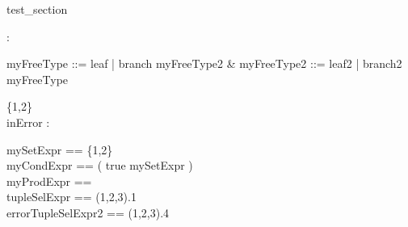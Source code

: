 \begin{zsection}
 \SECTION test\_section
\end{zsection}


\begin{zed}
[ \arithmos ]
\end{zed}

\begin{zed}
  [A,B]
\end{zed}

\begin{axdef}
 \nat : \power \arithmos
\end{axdef}

\begin{zed}
  myFreeType ::= leaf | branch \ldata myFreeType2 \rdata &
  myFreeType2 ::= leaf2 | branch2 \ldata myFreeType \rdata
\end{zed}

\begin{axdef}
  \{1,2\}\\
  inError : \nat
\end{axdef}

\begin{zed}
  mySetExpr == \{1,2\}\\
  myCondExpr == ( \IF true \THEN \nat \ELSE mySetExpr )\\
  myProdExpr == \nat \cross \nat \cross \nat\\
  tupleSelExpr == (1,2,3).1\\
  errorTupleSelExpr2 == (1,2,3).4
\end{zed}
